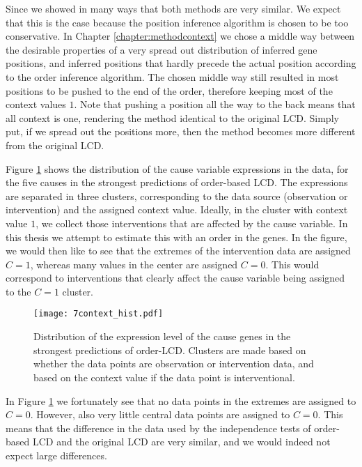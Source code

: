 Since we showed in many ways that both methods are very similar. We expect that this is the case because the position inference algorithm is chosen to be too conservative. In Chapter \ref{chapter:methodcontext} we chose a middle way between the desirable properties of a very spread out distribution of inferred gene positions, and inferred positions that hardly precede the actual position according to the order inference algorithm. The chosen middle way still resulted in most positions to be pushed to the end of the order, therefore keeping most of the context values $1$. Note that pushing a position all the way to the back means that all context is one, rendering the method identical to the original LCD. Simply put, if we spread out the positions more, then the method becomes more different from the original LCD. 

Figure \ref{fig:7:contexthist} shows the distribution of the cause variable expressions in the data, for the five causes in the strongest predictions of order-based LCD. The expressions are separated in three clusters, corresponding to the data source (observation or intervention) and the assigned context value. Ideally, in the cluster with context value $1$, we collect those interventions that are affected by the cause variable. In this thesis we attempt to estimate this with an order in the genes. In the figure, we would then like to see that the extremes of the intervention data are assigned $C=1$, whereas many values in the center are assigned $C=0$. This would correspond to interventions that clearly affect the cause variable being assigned to the $C=1$ cluster. 

\begin{figure}[h]
    \centering
    \texttt{[image: 7context\_hist.pdf]}
    \caption{Distribution of the expression level of the cause genes in the strongest predictions of order-LCD. Clusters are made based on whether the data points are observation or intervention data, and based on the context value if the data point is interventional.}
    \label{fig:7:contexthist}
\end{figure}

In Figure \ref{fig:7:contexthist} we fortunately see that no data points in the extremes are assigned to $C=0$. However, also very little central data points are assigned to $C=0$. This means that the difference in the data used by the independence tests of order-based LCD and the original LCD are very similar, and we would indeed not expect large differences. 








